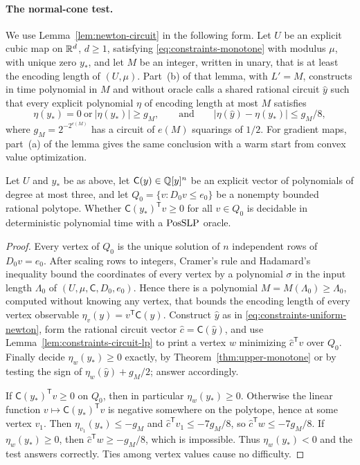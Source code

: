 \paragraph{The normal-cone test.}
We use Lemma~\ref{lem:newton-circuit} in the following form. Let $U$ be an
explicit cubic map on $\mathbb R^d$, $d\ge1$, satisfying
\eqref{eq:constraints-monotone} with modulus $\mu$, with unique zero $y_*$,
and let $M$ be an integer, written in unary, that is at least the encoding
length of $(U,\mu)$. Part~(b) of that lemma, with $L'=M$, constructs in time
polynomial in $M$ and without oracle calls a shared rational circuit $\hat y$
such that every explicit polynomial $\eta$ of encoding length at most $M$
satisfies
\begin{equation}\label{eq:constraints-uniform-newton}
 \eta(y_*)=0\ \text{or}\ |\eta(y_*)|\ge g_M,
 \qquad\text{and}\qquad |\eta(\hat y)-\eta(y_*)|\le g_M/8,
\end{equation}
where $g_M=2^{-2^{e(M)}}$ has a circuit of $e(M)$ squarings of $1/2$. For
gradient maps, part~(a) of the lemma gives the same conclusion with a warm
start from convex value optimization.

\begin{lemma}
\label{lem:constraints-cone-test}
Let $U$ and $y_*$ be as above, let $\mathsf C(y)\in\mathbb Q[y]^n$ be an explicit
vector of polynomials of degree at most three, and let
$Q_0=\{v:D_0v\le e_0\}$ be a nonempty bounded rational polytope. Whether
$\mathsf C(y_*)^{\mathsf T}v\ge0$ for all $v\in Q_0$ is decidable in
deterministic polynomial time with a $\mathrm{PosSLP}$ oracle.
\end{lemma}

\begin{proof}
Every vertex of $Q_0$ is the unique solution of $n$ independent rows of
$D_0v=e_0$. After scaling rows to integers, Cramer's rule and Hadamard's
inequality bound the coordinates of every vertex by a polynomial $\sigma$ in
the input length $\Lambda_0$ of $(U,\mu,\mathsf C,D_0,e_0)$. Hence there is a
polynomial $M=M(\Lambda_0)\ge\Lambda_0$, computed without knowing any vertex,
that bounds the encoding length of every vertex observable
$\eta_v(y)=v^{\mathsf T}\mathsf C(y)$. Construct $\hat y$ as in
\eqref{eq:constraints-uniform-newton}, form the rational circuit vector
$\hat c=\mathsf C(\hat y)$, and use Lemma~\ref{lem:constraints-circuit-lp} to
print a vertex $w$ minimizing $\hat c^{\mathsf T}v$ over $Q_0$. Finally decide
$\eta_w(y_*)\ge0$ exactly, by Theorem~\ref{thm:upper-monotone} or by testing
the sign of $\eta_w(\hat y)+g_M/2$; answer accordingly.

If $\mathsf C(y_*)^{\mathsf T}v\ge0$ on $Q_0$, then in particular
$\eta_w(y_*)\ge0$. Otherwise the linear function
$v\mapsto\mathsf C(y_*)^{\mathsf T}v$ is negative somewhere on the polytope,
hence at some vertex $v_1$. Then $\eta_{v_1}(y_*)\le-g_M$ and
$\hat c^{\mathsf T}v_1\le-7g_M/8$, so $\hat c^{\mathsf T}w\le-7g_M/8$. If
$\eta_w(y_*)\ge0$, then $\hat c^{\mathsf T}w\ge-g_M/8$, which is
impossible. Thus
$\eta_w(y_*)<0$ and the test answers correctly. Ties among vertex values cause
no difficulty.
\end{proof}

